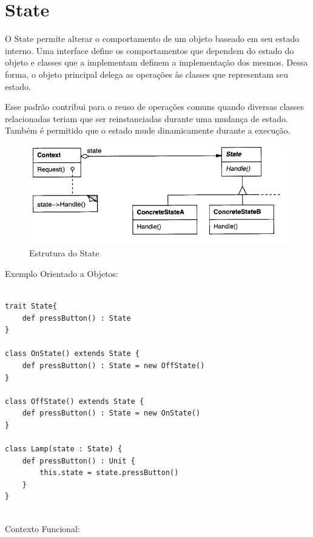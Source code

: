 \section{State}

O State permite alterar o comportamento de um objeto baseado 
em seu estado interno. Uma interface define os comportamentos 
que dependem do estado do objeto e classes que a implementam 
definem a implementação dos mesmos. Dessa forma, o objeto 
principal delega as operações às classes que representam 
seu estado.

Esse padrão contribui para o reuso de operações comuns quando 
diversas classes relacionadas teriam que ser reinstanciadas 
durante uma mudança de estado. Também é permitido que o 
estado mude dinamicamente durante a execução.

\begin{figure}[htb]
	\caption{\label{fig_grafico}Estrutura do State}
	\begin{center}
	    \includegraphics[scale=0.5]{5_padroes-contexto-funcional/5.3_comportamentais/5.3.08_state/diagram.png}
	\end{center}
\end{figure}

Exemplo Orientado a Objetos:

\begin{lstlisting}[caption={State Orientação a Objetos},label=oostate]

trait State{
    def pressButton() : State
}

class OnState() extends State {
    def pressButton() : State = new OffState()
}

class OffState() extends State {
    def pressButton() : State = new OnState()
}

class Lamp(state : State) {
    def pressButton() : Unit {
        this.state = state.pressButton()
    }
}
    
\end{lstlisting}

Contexto Funcional:

